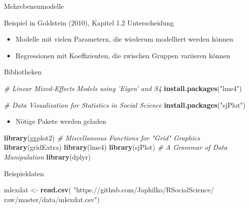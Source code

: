 \documentclass[ignorenonframetext,]{beamer}
\newenvironment{Shaded}{}{}
\newcommand{\KeywordTok}[1]{\textcolor[rgb]{0.00,0.44,0.13}{\textbf{{#1}}}}
\newcommand{\StringTok}[1]{\textcolor[rgb]{0.25,0.44,0.63}{{#1}}}
\newcommand{\CommentTok}[1]{\textcolor[rgb]{0.38,0.63,0.69}{\textit{{#1}}}}
\newcommand{\NormalTok}[1]{{#1}}
\providecommand{\tightlist}{%
\setlength{\itemsep}{0pt}\setlength{\parskip}{0pt}}
\begin{document}
\begin{frame}[fragile]{Mehrebenenmodelle}
\begin{block}{Beispiel in Goldstein (2010), Kapitel 1.2}
Unterscheidung

\begin{itemize}
\tightlist
\item
  Modelle mit vielen Parametern, die wiederum modelliert werden können
\item
  Regressionen mit Koeffizienten, die zwischen Gruppen variieren können
\end{itemize}

\end{block}

\begin{block}{Bibliotheken}

\begin{Shaded}
\begin{Highlighting}[]
\CommentTok{# Linear Mixed-Effects Models using 'Eigen' and S4}
\KeywordTok{install.packages}\NormalTok{(}\StringTok{"lme4"}\NormalTok{)}

\CommentTok{# Data Visualization for Statistics in Social Science}
\KeywordTok{install.packages}\NormalTok{(}\StringTok{"sjPlot"}\NormalTok{)}
\end{Highlighting}
\end{Shaded}

\begin{itemize}
\tightlist
\item
  Nötige Pakete werden geladen
\end{itemize}

\begin{Shaded}
\begin{Highlighting}[]
\KeywordTok{library}\NormalTok{(ggplot2)}
\CommentTok{# Miscellaneous Functions for "Grid" Graphics}
\KeywordTok{library}\NormalTok{(gridExtra)}
\KeywordTok{library}\NormalTok{(lme4)}
\KeywordTok{library}\NormalTok{(sjPlot)}
\CommentTok{# A Grammar of Data Manipulation}
\KeywordTok{library}\NormalTok{(dplyr)}
\end{Highlighting}
\end{Shaded}

\end{block}

\begin{block}{Beispieldaten}

\begin{Shaded}
\begin{Highlighting}[]
\NormalTok{mlexdat <-}\StringTok{ }\KeywordTok{read.csv}\NormalTok{(}
\StringTok{"https://github.com/Japhilko/RSocialScience/}
\StringTok{raw/master/data/mlexdat.csv"}\NormalTok{) }
\end{Highlighting}
\end{Shaded}


\end{block}
\end{frame}
\end{document}
